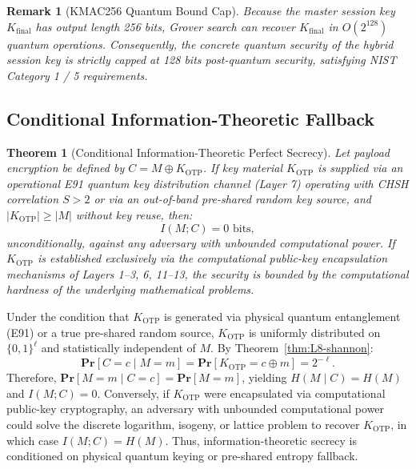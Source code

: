 \documentclass{ieeeaccess}
\renewcommand{\Pr}{\mathbf{Pr}}
\newtheorem{theorem}{Theorem}
\newtheorem{remark}{Remark}
\newenvironment{proof}{\begin{IEEEproof}\IEEEQEDoff}{\end{IEEEproof}}
\begin{document}
\begin{remark}[KMAC256 Quantum Bound Cap]
Because the master session key $K_{\mathrm{final}}$ has output length 256 bits, Grover search can recover $K_{\mathrm{final}}$ in $O(2^{128})$ quantum operations. Consequently, the concrete quantum security of the hybrid session key is strictly capped at 128 bits post-quantum security, satisfying NIST Category 1 / 5 requirements.
\end{remark}

\subsection{Conditional Information-Theoretic Fallback}
\begin{theorem}[Conditional Information-Theoretic Perfect Secrecy]
\label{thm:it-fallback}
Let payload encryption be defined by $C = M \oplus K_{\mathrm{OTP}}$. If key material $K_{\mathrm{OTP}}$ is supplied via an operational E91 quantum key distribution channel (Layer 7) operating with CHSH correlation $S > 2$ or via an out-of-band pre-shared random key source, and $|K_{\mathrm{OTP}}| \ge |M|$ without key reuse, then:
\begin{equation}
  I(M; C) = 0 \text{ bits},
\end{equation}
unconditionally, against any adversary with unbounded computational power.
If $K_{\mathrm{OTP}}$ is established exclusively via the computational public-key encapsulation mechanisms of Layers 1--3, 6, 11--13, the security is bounded by the computational hardness of the underlying mathematical problems.
\end{theorem}
\begin{proof}
Under the condition that $K_{\mathrm{OTP}}$ is generated via physical quantum entanglement (E91) or a true pre-shared random source, $K_{\mathrm{OTP}}$ is uniformly distributed on $\{0,1\}^\ell$ and statistically independent of $M$.
By Theorem~\ref{thm:L8-shannon}:
\begin{equation}
  \Pr[C = c \mid M = m] = \Pr[K_{\mathrm{OTP}} = c \oplus m] = 2^{-\ell}.
\end{equation}
Therefore, $\Pr[M = m \mid C = c] = \Pr[M = m]$, yielding $H(M \mid C) = H(M)$ and $I(M; C) = 0$.
Conversely, if $K_{\mathrm{OTP}}$ were encapsulated via computational public-key cryptography, an adversary with unbounded computational power could solve the discrete logarithm, isogeny, or lattice problem to recover $K_{\mathrm{OTP}}$, in which case $I(M; C) = H(M)$. Thus, information-theoretic secrecy is conditioned on physical quantum keying or pre-shared entropy fallback.
\end{proof}
\end{document}
